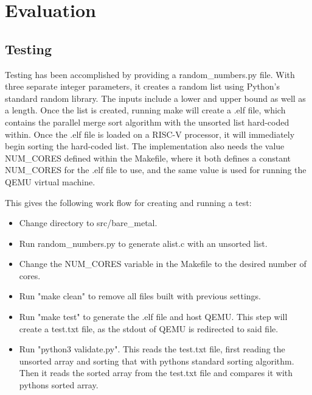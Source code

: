 \section{Evaluation}
\subsection{Testing}\label{sec:testing}
Testing has been accomplished by providing a random\_numbers.py file. With three
separate integer parameters, it creates a random list using Python's standard
random library. The inputs include a lower and upper bound as well as a length.
Once the list is created, running make will create a .elf file, which contains
the parallel merge sort algorithm with the unsorted list hard-coded within. Once
the .elf file is loaded on a RISC-V processor, it will immediately begin sorting
the hard-coded list. The implementation also needs the value NUM\_CORES defined
within the Makefile, where it both defines a constant NUM\_CORES for the .elf
file to use, and the same value is used for running the QEMU virtual machine.

This gives the following work flow for creating and running a test:
\begin{itemize}
\item Change directory to src/bare\_metal.
\item Run random\_numbers.py to generate alist.c with an unsorted list.
\item Change the NUM\_CORES variable in the Makefile to the desired number of
  cores.
\item Run "make clean" to remove all files built with previous settings.
\item Run "make test" to generate the .elf file and host QEMU. This step will
  create a test.txt file, as the stdout of QEMU is redirected to said file.
\item Run "python3 validate.py". This reads the test.txt file, first reading the
  unsorted array and sorting that with pythons standard sorting algorithm. Then
  it reads the sorted array from the test.txt file and compares it with pythons
  sorted array.
\end{itemize}

